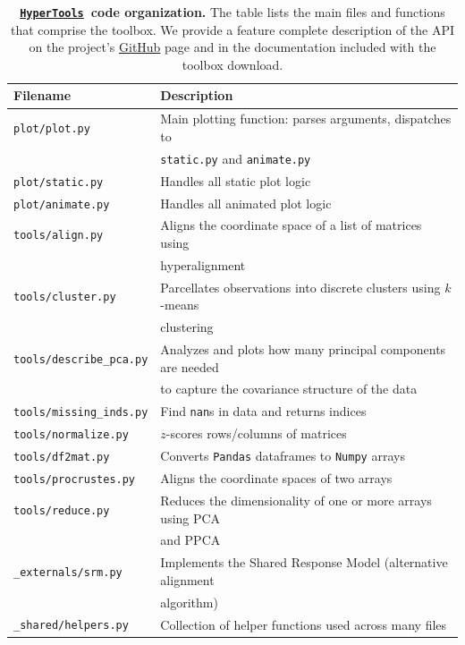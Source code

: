 \documentclass[12pt,letterpaper]{article}
\newcommand{\hypertools}{\href{https://github.com/ContextLab/hypertools}{\texttt{HyperTools}}}
\begin{document}
\begin{table}[tbp]

\centering
    \begin{tabular}{m{2in} m{4.4in}}
    \toprule
    \textbf{Filename} & \textbf{Description} \\ \hline
    \texttt{plot/plot.py} & Main plotting function: parses arguments, dispatches to \\
    & \texttt{static.py} and \texttt{animate.py} \\ 
    \texttt{plot/static.py} & Handles all static plot logic \\
    \texttt{plot/animate.py} & Handles all animated plot logic \\ 
    \texttt{tools/align.py} & Aligns the coordinate space of a list of matrices using \\
    & hyperalignment\\
	\texttt{tools/cluster.py} & Parcellates observations into discrete clusters using $k$-means\\
    & clustering\\ 
    \texttt{tools/describe\_pca.py} & Analyzes and plots how many principal components are needed\\
    & to capture the covariance structure of the data\\
    \texttt{tools/missing\_inds.py} & Find \texttt{nan}s in data and returns indices\\
    \texttt{tools/normalize.py} & $z$-scores rows/columns of matrices\\
    \texttt{tools/df2mat.py} & Converts \texttt{Pandas} dataframes to \texttt{Numpy} arrays \\ 
    \texttt{tools/procrustes.py} & Aligns the coordinate spaces of two arrays \\ 
    \texttt{tools/reduce.py} & Reduces the dimensionality of one or more arrays using PCA\\
    & and PPCA\\ 
    \texttt{\_externals/srm.py} & Implements the Shared Response Model (alternative alignment\\
    & algorithm) \\ 
    \texttt{\_shared/helpers.py} & Collection of helper functions used across many files\\
	\bottomrule
    \end{tabular}
\vspace{0.1in}
\caption{\textbf{\hypertools~code organization.}  The table lists the main files and functions that comprise the toolbox.  We provide a feature complete description of the API on the project's \href{https://github.com/ContextLab/hypertools}{GitHub} page and in the documentation included with the toolbox download.}
\label{tab:organization}
\end{table}
\end{document}
